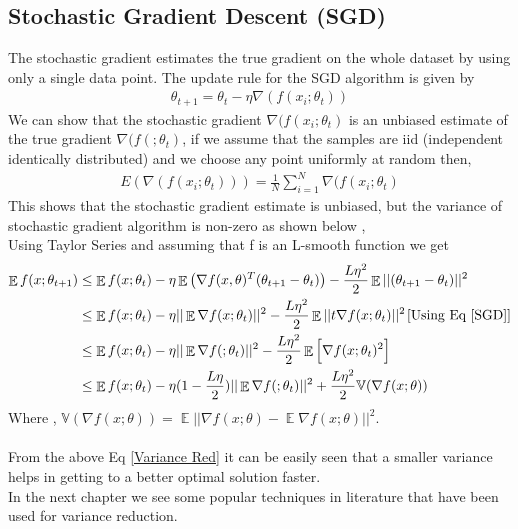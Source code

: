 \documentclass[a4paper,twoside]{iiththesis}
\theoremstyle{definition}
\theoremstyle{definition}
\theoremstyle{remark}
\DeclareMathOperator*{\E}{\mathop{\mathbb{E}}}
\begin{document}
\subsection{Stochastic Gradient Descent (SGD)}
The stochastic gradient estimates the true gradient on the whole dataset by using only a single data point. The update rule for the SGD algorithm is given by 
\begin{align}
\theta_{t+1} = \theta_{t} - \eta \nabla(f(x_i; \theta_t)) \label{SGD}
\end{align}
We can show that the stochastic gradient  $\nabla(f(x_i; \theta_t)$ is an unbiased estimate of the true gradient $\nabla(f(; \theta_t)$, if we assume that the samples are iid (independent identically distributed) and we choose any point uniformly at random then, 
\begin{align}
E(\nabla(f(x_i; \theta_t))) = \frac{1}{N} \sum_{i=1}^N \nabla(f(x_i; \theta_t) 
\end{align}
This shows that the stochastic gradient estimate is unbiased, but the variance of stochastic gradient algorithm is non-zero as shown below , \\
Using Taylor Series and assuming that f is an L-smooth function we get
\begin{align}
\E f(x; \theta_{t+1}) &\leq \space  \E f(x; \theta_t) - \eta \E \big(\nabla f(x, \theta)^T (\theta_{t+1} - \theta_{t})\big) - \frac{L\eta^2}{2} \E || (\theta_{t+1} - \theta_{t}) || ^2 \\
& \leq \E f(x; \theta_t) - \eta ||\E \nabla  f(x; \theta_{t})||^2 - \frac{L\eta^2}{2} \E ||t\nabla f(x; \theta_{t})||^2  \hspace{1.2pt} \text{[Using Eq \ref{SGD}]} \\ 
&\leq \E f(x; \theta_t) - \eta ||\E \nabla f(; \theta_{t})||^2 - \frac{L\eta^2}{2} \E\Big[ \nabla f(x; \theta_{t})^2\Big] \\
&\leq \E f(x; \theta_t) - \eta(1 -\frac{L\eta}{2}) ||\E \nabla f(; \theta_{t})||^2 + \frac{L\eta^2}{2}  \mathbb{V}(\nabla f(x ;\theta)) \label{Variance Red}
\end{align}
Where , $\mathbb{V}(\nabla f(x; \theta)) = \E || \nabla f(x; \theta) - \E\nabla f(x; \theta)||^2 $.\\\\
From the above Eq \ref{Variance Red} it can be easily seen that a smaller variance helps in getting to a better optimal solution faster.\\ In the next chapter we see some popular techniques in literature that have been used for variance reduction.
\end{document}
